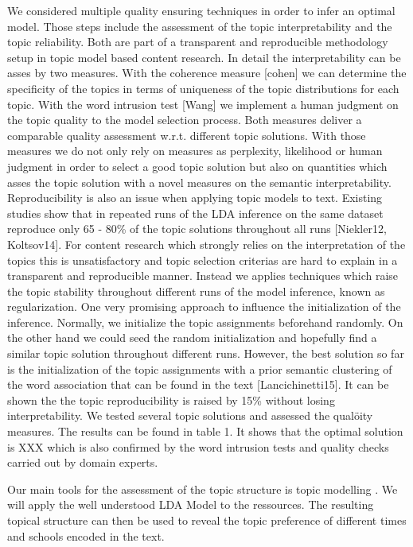 \documentclass[a4paper,10pt]{article}
\newcommand{\TODO}[1]{\begingroup\color{red}#1\endgroup}
\begin{document}
We considered multiple quality ensuring techniques in
order to infer an optimal model. Those steps include the assessment of the
topic interpretability and the topic reliability. Both are part of a
transparent and reproducible methodology setup in topic model based content
research.  In detail the interpretability can be asses by two
measures. With the coherence measure [cohen] we can determine the
specificity of the topics in terms of uniqueness of the topic distributions
for each topic. With the word intrusion test [Wang] we implement a human
judgment on the topic quality to the model selection process. Both measures
deliver a comparable quality assessment w.r.t. different topic
solutions. With those measures we do not only rely on measures as
perplexity, likelihood or human judgment in order to select a good topic
solution but also on quantities which asses the topic solution with a novel
measures on the semantic interpretability. Reproducibility is also an issue
when applying topic models to text. Existing studies show that in repeated
runs of the LDA inference on the same dataset reproduce only 65 - 80\% of
the topic solutions throughout all runs [Niekler12, Koltsov14]. For content
research which strongly relies on the interpretation of the topics this is
unsatisfactory and topic selection criterias are hard to explain in a
transparent and reproducible manner. Instead we applies techniques which
raise the topic stability throughout different runs of the model inference,
known as regularization. One very promising approach to influence the
initialization of the inference. Normally, we initialize the topic
assignments beforehand randomly. On the other hand we could seed the random
initialization and hopefully find a similar topic solution throughout
different runs. However, the best solution so far is the initialization of
the topic assignments with a prior semantic clustering of the word
association that can be found in the text [Lancichinetti15]. It can be
shown the the topic reproducibility is raised by 15\% without losing
interpretability. We tested several topic solutions and assessed the
qualöity measures. The results can be found in table 1. It shows that the
optimal solution is XXX which is also confirmed by the word intrusion tests
and quality checks carried out by domain experts.





  Our main tools for the assessment of the topic structure is topic
  modelling .  We will apply the well understood LDA Model to
  the ressources. The resulting topical structure can then be used to
  reveal the topic preference of different times and \TODO{schools} encoded
  in the text.
\end{document}
